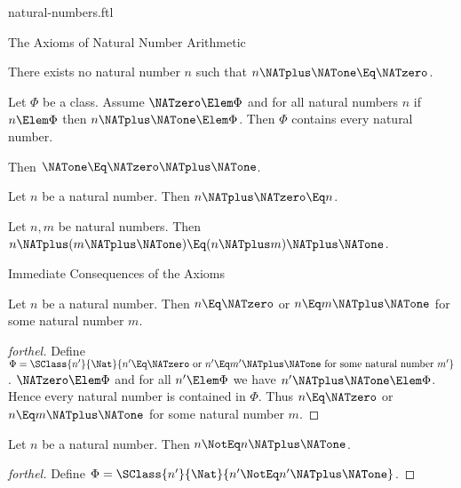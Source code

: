 \documentclass{stex}
\begin{document}
\begin{smodule}{natural-numbers.ftl}
\begin{sfragment}{The Axioms of Natural Number Arithmetic}
  \begin{axiom}[forthel,id=ARITHMETIC_01_4454289938317312]
    There exists no natural number $n$ such that $n \NATplus \NATone \Eq \NATzero$.
  \end{axiom}

  \begin{axiom}[forthel,title=Induction,id=ARITHMETIC_01_4764664342773760]
    Let $\Phi$ be a class.
    Assume $\NATzero \Elem \Phi$ and for all natural numbers $n$ if $n \Elem \Phi$ then
    $n \NATplus \NATone \Elem \Phi$.
    Then $\Phi$ contains every natural number.
  \end{axiom}

  \begin{axiom}[forthel,id=ARITHMETIC_03_5962332515874540]
    Then $\NATone \Eq \NATzero \NATplus \NATone$.
  \end{axiom}

  \begin{axiom}[forthel,id=ARITHMETIC_03_4827955356237824]
    Let $n$ be a natural number.
    Then $n \NATplus \NATzero \Eq n$.
  \end{axiom}

  \begin{axiom}[forthel,id=ARITHMETIC_03_4427935386238924]
    Let $n, m$ be natural numbers.
    Then $n \NATplus (m \NATplus \NATone) \Eq (n \NATplus m) \NATplus \NATone$.
  \end{axiom}
\end{sfragment}

\begin{sfragment}{Immediate Consequences of the Axioms}
  \begin{proposition}[forthel,id=ARITHMETIC_01_4966080109871104]
    Let $n$ be a natural number.
    Then $n \Eq \NATzero$ or $n \Eq m \NATplus \NATone$ for some natural number $m$.
  \end{proposition}
  \begin{proof}[forthel]
    Define $\Phi = \SClass{n'}{\Nat}{n' \Eq \NATzero\text{ or }n' \Eq m' \NATplus \NATone\text{ for some natural number }m'}$.
    $\NATzero \Elem \Phi$ and for all $n' \Elem  \Phi$ we have $n' \NATplus \NATone \Elem \Phi$.
    Hence every natural number is contained in $\Phi$.
    Thus $n \Eq \NATzero$ or $n \Eq m \NATplus \NATone$ for some natural number $m$.
  \end{proof}

  \begin{proposition}[forthel,id=ARITHMETIC_01_5996049267163136]
    Let $n$ be a natural number.
    Then $n \NotEq n \NATplus \NATone$.
  \end{proposition}
  \begin{proof}[forthel]
    Define $\Phi = \SClass{n'}{\Nat}{n' \NotEq n' \NATplus \NATone}$.


\end{proof}
\end{sfragment}
\end{smodule}
\end{document}
